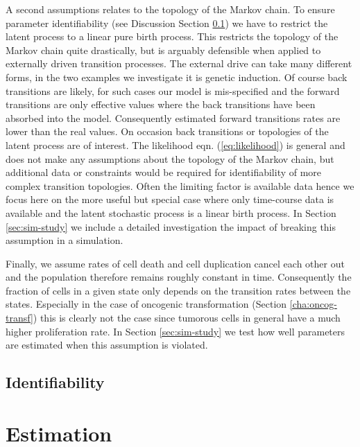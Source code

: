 \begin{figure}
{ }
  \label{fig:schematic-ass1}
\end{figure}

A second assumptions relates to the topology of the Markov chain. To ensure parameter identifiability (see Discussion Section \ref{sec:identifiability}) we have to restrict the latent process to a linear pure birth process. This restricts the topology of the Markov chain quite drastically, but is arguably defensible when applied to externally driven transition processes. The external drive can take many different forms, in the two examples we investigate it is genetic induction. Of course back transitions are likely, for such cases our model is mis-specified and the forward transitions are only effective values where the back transitions have been absorbed into the model. Consequently estimated forward transitions rates are lower than the real values. On occasion back transitions or topologies of the latent process are of interest.
The likelihood eqn. (\ref{eq:likelihood}) is general and does not make any assumptions about the topology of the Markov chain, but additional data or constraints would be required for identifiability of more complex transition topologies. Often the limiting factor is available data hence we focus here on the more useful but special case where only time-course data is available and the latent stochastic process is a linear birth process. In Section \ref{sec:sim-study} we include a detailed investigation the impact of breaking this assumption in a simulation. 

Finally, we assume rates of cell death and cell duplication cancel each other out and the population therefore remains roughly constant in time. Consequently the fraction of cells in a given state only depends on the transition rates between the states. Especially in the case of oncogenic transformation (Section \ref{cha:oncog-transf}) this is clearly not the case since tumorous cells in general have a much higher proliferation rate. In Section \ref{sec:sim-study} we test how well parameters are estimated when this assumption is violated.

\subsection{Identifiability}
\label{sec:identifiability}


\section{Estimation}
\label{sec:estimation}

